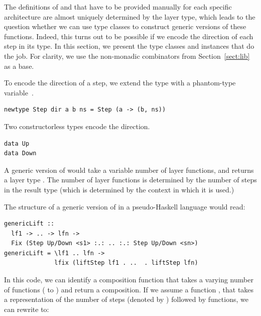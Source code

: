 \documentclass[preprint,natbib]{sigplanconf}
\begin{document}
The definitions of  and  that have to be provided manually for each specific architecture are almost uniquely determined by the layer type, which leads to the question whether we can use type classes to construct generic versions of these functions. Indeed, this turns out to be possible if we encode the direction of each step in its type. In this section, we present the type classes and instances that do the job. For clarity, we use the non-monadic combinators from Section~\ref{sect:lib} as a base.

To encode the direction of a step, we extend the  type with a phantom-type variable~\cite{leijen99dsecs}.

\begin{small}
\begin{verbatim}
newtype Step dir a b ns = Step (a -> (b, ns))
\end{verbatim}
\end{small}

Two constructorless types encode the direction.

\begin{small}
\begin{verbatim}
data Up 
data Down 
\end{verbatim}
\end{small}




A generic version of  would take a variable number of layer functions, and returns a layer type . The number of layer functions is determined by the number of steps in the result type (which is determined by the context in which it is used.)

The structure of a generic version of  in a pseudo-Haskell language would read:

\begin{small}
\begin{verbatim}
genericLift :: 
  lf1 -> .. -> lfn ->
  Fix (Step Up/Down <s1> :.: .. :.: Step Up/Down <sn>)
genericLift = \lf1 .. lfn -> 
              lfix (liftStep lf1 . ..  . liftStep lfn)
\end{verbatim}%
\end{small}

In this code, we can identify a composition function that takes a varying number of functions ( to ) and return a composition. If we assume a function , that takes a representation of the number of steps (denoted by ) followed by  functions, we can rewrite  to:
\end{document}
